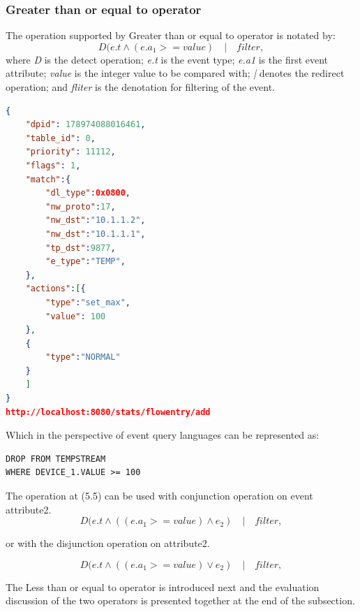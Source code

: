 \subsubsection{Greater than or equal to operator}
The operation supported by Greater than or equal to operator is notated by:
\begin{equation}D(e.t  \wedge (e.a_1 >= value) \quad | \quad filter, \end{equation}
where \textit{D} is the detect operation; \newline
\textit{e.t} is the event type; \newline
\textit{e.a1} is the first event attribute; \newline
\textit{value} is the integer value to be compared with; \newline
\textit{|} denotes the redirect operation; \newline
and \textit{fliter} is the denotation for filtering of the event. \newline \newline
\begin{lstlisting}[language=json,firstnumber=1]
{
	"dpid": 178974088016461,
	"table_id": 0,
	"priority": 11112,
	"flags": 1,
	"match":{
		"dl_type":0x0800,
		"nw_proto":17,
		"nw_dst":"10.1.1.2",
		"nw_dst":"10.1.1.1",
		"tp_dst":9877,
		"e_type":"TEMP",
	},
	"actions":[{
		"type":"set_max",
		"value": 100
	},
	{
		"type":"NORMAL"
	}
	]
}
http://localhost:8080/stats/flowentry/add \end{lstlisting}

Which in the perspective of event query languages can be represented as:

\begin{verbatim}
DROP FROM TEMPSTREAM
WHERE DEVICE_1.VALUE >= 100
\end{verbatim}

The operation at (5.5) can be used with conjunction operation on event attribute2.
\begin{equation}D(e.t  \wedge ((e.a_1 >= value) \wedge e_2 )\quad | \quad filter, \end{equation}

or with the disjunction operation on attribute2.

\begin{equation}D(e.t  \wedge ((e.a_1 >= value) \vee e_2 )\quad | \quad filter, \end{equation}

 The Less than or equal to operator is introduced next and the evaluation discussion of the two operators is presented together at the end of the subsection.

